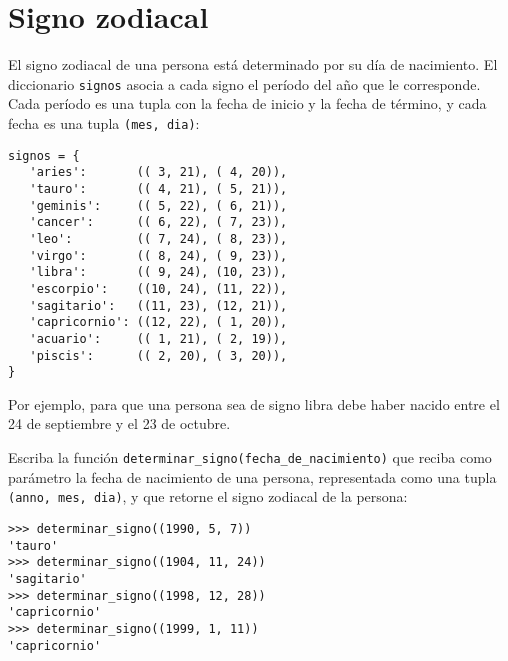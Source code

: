 \section{Signo zodiacal}

El signo zodiacal de una persona está determinado por su día de nacimiento.
El diccionario \lstinline!signos! asocia a cada signo el período del año
que le corresponde. Cada período es una tupla con la fecha de inicio y
la fecha de término, y cada fecha es una tupla \lstinline!(mes, dia)!:
\begin{lstlisting}
signos = {
   'aries':       (( 3, 21), ( 4, 20)),
   'tauro':       (( 4, 21), ( 5, 21)),
   'geminis':     (( 5, 22), ( 6, 21)),
   'cancer':      (( 6, 22), ( 7, 23)),
   'leo':         (( 7, 24), ( 8, 23)),
   'virgo':       (( 8, 24), ( 9, 23)),
   'libra':       (( 9, 24), (10, 23)),
   'escorpio':    ((10, 24), (11, 22)),
   'sagitario':   ((11, 23), (12, 21)),
   'capricornio': ((12, 22), ( 1, 20)),
   'acuario':     (( 1, 21), ( 2, 19)),
   'piscis':      (( 2, 20), ( 3, 20)),
}
\end{lstlisting}

Por ejemplo, para que una persona sea de signo libra debe haber nacido
entre el 24 de septiembre y el 23 de octubre.

Escriba la función \lstinline!determinar_signo(fecha_de_nacimiento)! que
reciba como parámetro la fecha de nacimiento de una persona,
representada como una tupla \lstinline!(anno, mes, dia)!, y que retorne
el signo zodiacal de la persona:
\begin{lstlisting}
>>> determinar_signo((1990, 5, 7))
'tauro'
>>> determinar_signo((1904, 11, 24))
'sagitario'
>>> determinar_signo((1998, 12, 28))
'capricornio'
>>> determinar_signo((1999, 1, 11))
'capricornio'
\end{lstlisting}

